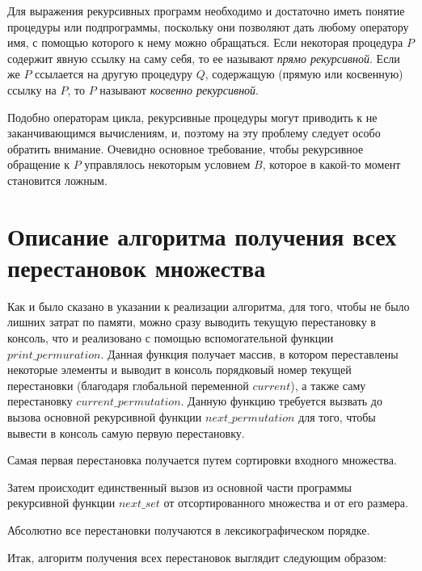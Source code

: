 \documentclass[bachelor, och, labwork]{shiza}
\begin{document}
Для выражения рекурсивных программ необходимо и достаточно иметь понятие
процедуры или подпрограммы, поскольку они позволяют дать любому оператору имя,
с помощью которого к нему можно обращаться. Если некоторая процедура $P$
содержит явную ссылку на саму себя, то ее называют \textit{прямо рекурсивной}.
Если же $P$ ссылается на другую процедуру $Q$, содержащую (прямую или косвенную)
ссылку на $P$, то $P$ называют \textit{косвенно рекурсивной}.

Подобно операторам цикла, рекурсивные процедуры могут приводить к
не заканчивающимся вычислениям, и, поэтому на эту проблему следует особо обратить
внимание. Очевидно основное требование, чтобы рекурсивное обращение к $P$
управлялось некоторым условием $B$, которое в какой-то момент становится ложным.

\section{Описание алгоритма получения всех перестановок множества}
Как и было сказано в указании к реализации алгоритма, для того, чтобы
не было лишних затрат по памяти, можно сразу выводить текущую перестановку
в консоль, что и реализовано с помощью вспомогательной функции $print\_permuration$.
Данная функция получает массив, в котором переставлены некоторые элементы
и выводит в консоль порядковый номер текущей перестановки (благодаря глобальной
переменной $current$), а также саму перестановку $current\_permutation$.
Данную функцию требуется вызвать до вызова основной рекурсивной функции 
$next\_permutation$ для того, чтобы вывести в консоль самую первую перестановку.

Самая первая перестановка получается путем сортировки входного множества.

Затем происходит единственный вызов из основной части программы рекурсивной
функции $next\_set$ от отсортированного множества и от его размера.

Абсолютно все перестановки получаются в лексикографическом порядке.

Итак, алгоритм получения всех перестановок выглядит следующим образом:
\end{document}
